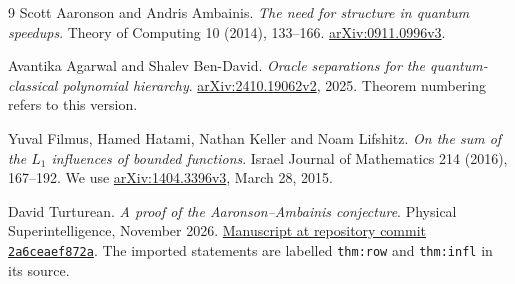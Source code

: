 \documentclass[11pt]{article}
\theoremstyle{remark}\newtheorem{remark}[theorem]{Remark}
\begin{document}
\begin{thebibliography}{9}
 Scott Aaronson and Andris Ambainis.
\emph{The need for structure in quantum speedups}.
Theory of Computing 10 (2014), 133--166.
\href{https://arxiv.org/abs/0911.0996v3}{arXiv:0911.0996v3}.

 Avantika Agarwal and Shalev Ben-David.
\emph{Oracle separations for the quantum-classical polynomial hierarchy}.
\href{https://arxiv.org/abs/2410.19062v2}{arXiv:2410.19062v2}, 2025.
Theorem numbering refers to this version.

 Yuval Filmus, Hamed Hatami, Nathan Keller and Noam Lifshitz.
\emph{On the sum of the $L_1$ influences of bounded functions}.
Israel Journal of Mathematics 214 (2016), 167--192.
We use \href{https://arxiv.org/abs/1404.3396v3}{arXiv:1404.3396v3}, March 28, 2015.

 David Turturean.
\emph{A proof of the Aaronson--Ambainis conjecture}.
Physical Superintelligence, November 2026.
\href{https://github.com/physical-superintelligence/aaronson-ambainis/blob/2a6ceaef872ae993708950f951989134084b851a/paper/aaronson_ambainis_paper.tex}{Manuscript at repository commit \texttt{2a6ceaef872a}}.
The imported statements are labelled \texttt{thm:row} and \texttt{thm:infl} in its source.
\end{thebibliography}
\end{document}
